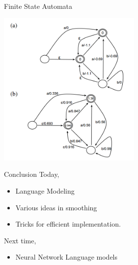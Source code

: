 \documentclass{beamer}
\begin{document}
\begin{frame}{Finite State Automata}
  \begin{center}
    \includegraphics[width=7cm]{fsa}
  \end{center}
\end{frame}


\begin{frame}{Conclusion}
  Today, 

  \begin{itemize}
  \item Language Modeling
  \item Various ideas in smoothing
  \item Tricks for efficient implementation.
  \end{itemize}
  \air 

  Next time,
  \begin{itemize}
  \item Neural Network Language models
  \end{itemize}
\end{frame}
\end{document}
